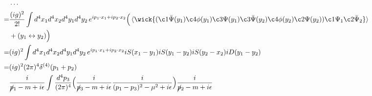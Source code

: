 \begin{itemize}
	\begin{tcolorbox}[title=calculation:]
		\begin{align}
			& \cdots \notag \\
			=& \frac{(i g)^2}{2!} \int d^4 x_1 d^4 x_2 d^4 y_1 d^4 y_2 \, e^{i p_1 \cdot x_1 + i p_2 \cdot x_2} \Big( \braket{\wick{
				(\c1 {\bar{\Psi}}(y_1) \c4 \phi(y_1) \c3 \Psi(y_1) \c3 {\bar{\Psi}}(y_2) \c4 \phi(y_2) \c2 \Psi(y_2)) \c1 \Psi_1 \c2 {\bar{\Psi}}_2
			}} \notag \\
			& + (y_1 \leftrightarrow y_2) \Big) \notag \\
			=& (i g)^2 \int d^4 x_1 d^4 x_2 d^4 y_1 d^4 y_2 \, e^{i p_1 \cdot x_1 + i p_2 \cdot x_2} i S(x_1 - y_1) i S(y_1 - y_2) i S(y_2 - x_2) i D(y_1 - y_2) \notag \\
			=& (i g)^2 (2 \pi)^4 \delta^{(4)}(p_1 + p_2) \notag \\
			& \frac{i}{\cancel{p}_1 - m + i \epsilon} \int \frac{d^4 p_3}{(2 \pi)^4} \Big( \frac{i}{\cancel{p}_3 - m + i \epsilon} \frac{i}{(p_1 - p_3)^2 - \mu^2 + i \epsilon} \Big) \frac{i}{\cancel{p}_2 - m + i \epsilon}
		\end{align}
	\end{tcolorbox}
\end{itemize}
